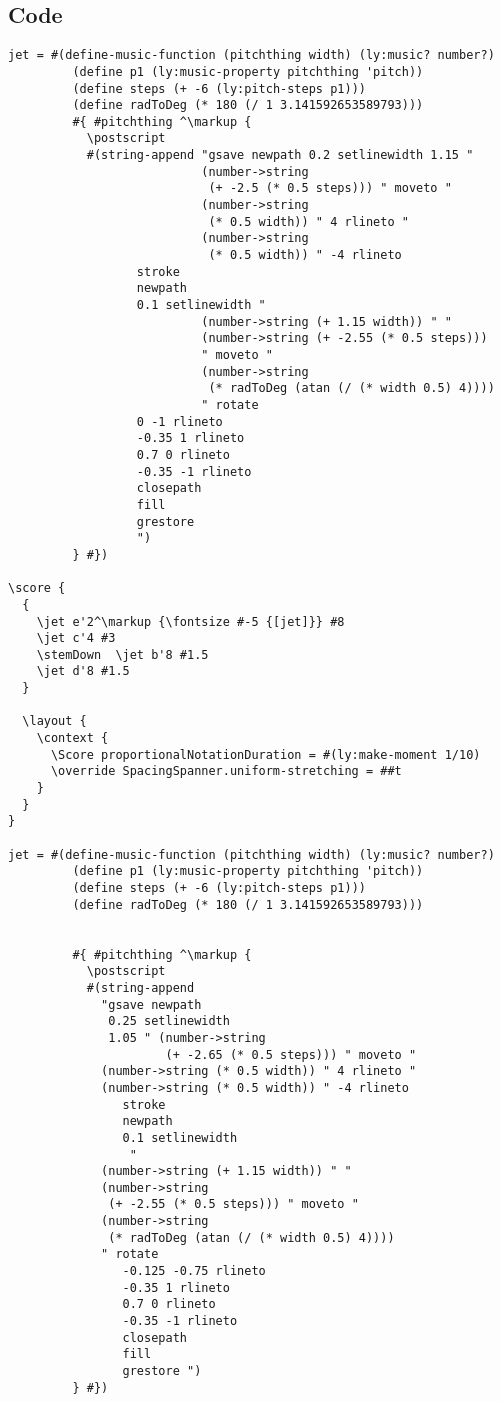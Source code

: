 \subsection{Code}
\begin{verbatim}
jet = #(define-music-function (pitchthing width) (ly:music? number?)
         (define p1 (ly:music-property pitchthing 'pitch))
         (define steps (+ -6 (ly:pitch-steps p1)))
         (define radToDeg (* 180 (/ 1 3.141592653589793)))
         #{ #pitchthing ^\markup {
           \postscript
           #(string-append "gsave newpath 0.2 setlinewidth 1.15 "
                           (number->string 
                           	(+ -2.5 (* 0.5 steps))) " moveto "
                           (number->string 
                           	(* 0.5 width)) " 4 rlineto "
                           (number->string 
                           	(* 0.5 width)) " -4 rlineto
                  stroke
                  newpath
                  0.1 setlinewidth "
                           (number->string (+ 1.15 width)) " "
                           (number->string (+ -2.55 (* 0.5 steps)))
                           " moveto "
                           (number->string   
                            (* radToDeg (atan (/ (* width 0.5) 4))))
                           " rotate
                  0 -1 rlineto
                  -0.35 1 rlineto
                  0.7 0 rlineto
                  -0.35 -1 rlineto
                  closepath
                  fill
                  grestore
                  ")
         } #})

\score {
  {
    \jet e'2^\markup {\fontsize #-5 {[jet]}} #8
    \jet c'4 #3
    \stemDown  \jet b'8 #1.5
    \jet d'8 #1.5
  }

  \layout {
    \context {
      \Score proportionalNotationDuration = #(ly:make-moment 1/10)
      \override SpacingSpanner.uniform-stretching = ##t
    }
  }
}

jet = #(define-music-function (pitchthing width) (ly:music? number?)
         (define p1 (ly:music-property pitchthing 'pitch))
         (define steps (+ -6 (ly:pitch-steps p1)))
         (define radToDeg (* 180 (/ 1 3.141592653589793)))


         #{ #pitchthing ^\markup {
           \postscript
           #(string-append
             "gsave newpath 
              0.25 setlinewidth 
              1.05 " (number->string
                      (+ -2.65 (* 0.5 steps))) " moveto "
             (number->string (* 0.5 width)) " 4 rlineto "
             (number->string (* 0.5 width)) " -4 rlineto
                stroke
                newpath
                0.1 setlinewidth 
                 "
             (number->string (+ 1.15 width)) " "
             (number->string
              (+ -2.55 (* 0.5 steps))) " moveto "
             (number->string
              (* radToDeg (atan (/ (* width 0.5) 4))))
             " rotate
                -0.125 -0.75 rlineto
                -0.35 1 rlineto
                0.7 0 rlineto
                -0.35 -1 rlineto
                closepath              
                fill
                grestore ")
         } #})



\end{verbatim}
